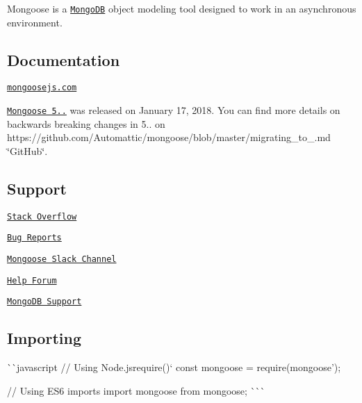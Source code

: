 Mongoose is a \href{https://www.mongodb.org/}{\tt Mongo\+DB} object modeling tool designed to work in an asynchronous environment.

\href{http://slack.mongoosejs.io}{\tt } \href{https://travis-ci.org/Automattic/mongoose}{\tt } \href{http://badge.fury.io/js/mongoose}{\tt }

\href{https://www.npmjs.com/package/mongoose}{\tt }

\subsection*{Documentation}

\href{http://mongoosejs.com/}{\tt mongoosejs.\+com}

\href{https://github.com/Automattic/mongoose/blob/master/History.md#500--2018-01-17}{\tt Mongoose 5..} was released on January 17, 2018. You can find more details on backwards breaking changes in 5.. on https\+://github.com/\+Automattic/mongoose/blob/master/migrating\+\_\+to\+\_.\+md \char`\"{}\+Git\+Hub\char`\"{}.

\subsection*{Support}


\begin{DoxyItemize}
\item \href{http://stackoverflow.com/questions/tagged/mongoose}{\tt Stack Overflow}
\item \href{https://github.com/Automattic/mongoose/issues/}{\tt Bug Reports}
\item \href{http://slack.mongoosejs.io/}{\tt Mongoose Slack Channel}
\item \href{http://groups.google.com/group/mongoose-orm}{\tt Help Forum}
\item \href{https://docs.mongodb.org/manual/support/}{\tt Mongo\+DB Support}
\end{DoxyItemize}

\subsection*{Importing}

\`{}\`{}{\ttfamily javascript // Using Node.\+js}require()` const mongoose = require(\textquotesingle{}mongoose');

// Using E\+S6 imports import mongoose from \textquotesingle{}mongoose\textquotesingle{}; \`{}\`{}\`{}

